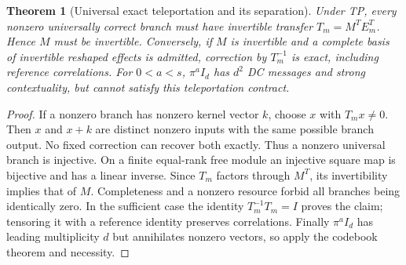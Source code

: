 \documentclass[11pt]{article}
\newtheorem{theorem}{Theorem}[section]
\theoremstyle{remark}
\begin{document}
\begin{theorem}[Universal exact teleportation and its separation]
Under TP, every nonzero universally correct branch must have invertible
transfer $T_m=M^T E_m^T$. Hence $M$ must be invertible. Conversely, if $M$ is
invertible and a complete basis of invertible reshaped effects is admitted,
correction by $T_m^{-1}$ is exact, including reference correlations.
For $0<a<s$, $\pi^a I_d$ has $d^2$ DC messages and strong contextuality, but
cannot satisfy this teleportation contract.
\end{theorem}
\begin{proof}
If a nonzero branch has nonzero kernel vector $k$, choose $x$ with $T_mx\ne0$.
Then $x$ and $x+k$ are distinct nonzero inputs with the same possible branch
output. No fixed correction can recover both exactly. Thus a nonzero universal
branch is injective. On a finite equal-rank free module an injective square map
is bijective and has a linear inverse. Since $T_m$ factors through $M^T$, its
invertibility implies that of $M$. Completeness and a nonzero resource forbid
all branches being identically zero. In the sufficient case the identity
$T_m^{-1}T_m=I$ proves the claim; tensoring it with a reference identity
preserves correlations. Finally $\pi^a I_d$ has leading multiplicity $d$ but
annihilates nonzero vectors, so apply the codebook theorem and necessity.
\end{proof}
\end{document}
